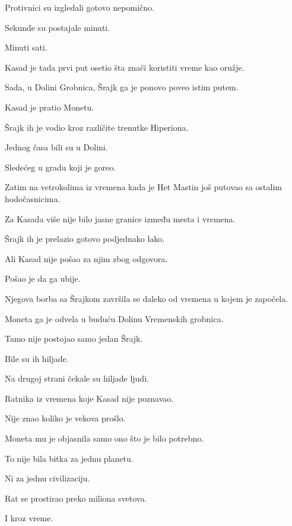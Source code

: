 Protivnici su izgledali gotovo nepomično.

Sekunde su postajale minuti.

Minuti sati.

\bigskip

Kasad je tada prvi put osetio šta znači koristiti vreme kao oružje.

Sada, u Dolini Grobnica, Šrajk ga je ponovo poveo istim putem.

\bigskip

Kasad je pratio Monetu.

Šrajk ih je vodio kroz različite trenutke Hiperiona.

Jednog časa bili su u Dolini.

Sledećeg u gradu koji je goreo.

Zatim na vetrokolima iz vremena kada je Het Mastin još putovao sa ostalim hodočasnicima.

\bigskip

Za Kasada više nije bilo jasne granice između mesta i vremena.

Šrajk ih je prelazio gotovo podjednako lako.

\bigskip

Ali Kasad nije pošao za njim zbog odgovora.

Pošao je da ga ubije.

\bigskip

Njegova borba sa Šrajkom završila se daleko od vremena u kojem je započela.

Moneta ga je odvela u buduću Dolinu Vremenskih grobnica.

\bigskip

Tamo nije postojao samo jedan Šrajk.

Bile su ih hiljade.

\bigskip

Na drugoj strani čekale su hiljade ljudi.

Ratnika iz vremena koje Kasad nije poznavao.

\bigskip

Nije znao koliko je vekova prošlo.

Moneta mu je objasnila samo ono što je bilo potrebno.

To nije bila bitka za jednu planetu.

Ni za jednu civilizaciju.

\bigskip

Rat se prostirao preko miliona svetova.

I kroz vreme.

